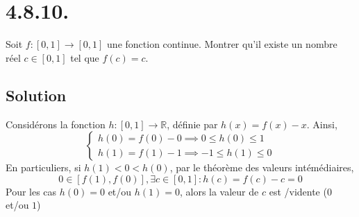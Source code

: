 \section*{4.8.10.}
	Soit $f:[0,1]\longrightarrow[0,1]$ une fonction continue. Montrer qu'il existe un nombre réel $c\in [0,1]$ tel que $f(c)=c$.
\subsection*{Solution}
	Considérons la fonction $h:[0,1]\longrightarrow\mathbb{R}$, définie par $h(x)=f(x)-x$. Ainsi,
	\[
	\begin{cases}
		h(0)=f(0)-0\implies 0\leq h(0) \leq 1\\
		h(1)=f(1)-1\implies -1\leq h(1) \leq 0
	\end{cases}
	\]
	En particuliers, si $h(1)< 0< h(0)$, par le théorème des valeurs intémédiaires,
	\[0 \in [f(1),f(0)], \exists c\in [0,1] : h(c)=f(c)-c=0\]
	Pour les cas $h(0)=0$ et/ou $h(1)=0$, alors la valeur de $c$ est /vidente ($0$ et/ou $1$)